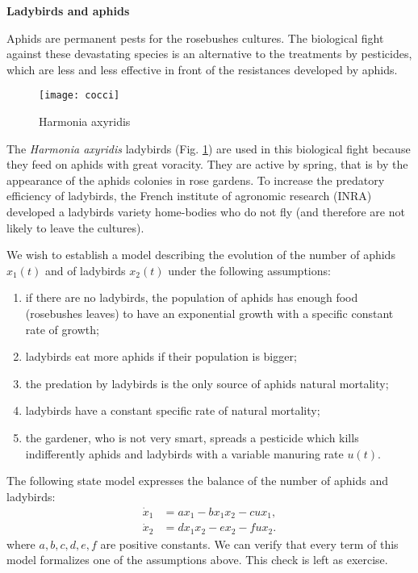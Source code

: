 \begin{exemple}{\bf Ladybirds and aphids}

Aphids are permanent pests for the rosebushes cultures. The biological fight against these devastating species is an alternative to the treatments by pesticides, which are less and less effective in front of the resistances developed by aphids.
\begin{figure}[ht]
\begin{center}
\texttt{[image: cocci]}
\caption{Harmonia axyridis}
\label{fig:cocci}
\end{center}
\end{figure}
The {\em Harmonia axyridis} ladybirds (Fig. \ref{fig:cocci}) are used in this biological fight because they feed on aphids with great voracity. They are active by spring, that is by the appearance of the aphids colonies in rose gardens. To increase the predatory efficiency of ladybirds, the French institute of agronomic research (INRA) developed a ladybirds variety \og home-bodies \gf who do not fly (and therefore are not likely to leave the cultures).

We wish to establish a model describing the evolution of the number of aphids $x_1(t)$ and of ladybirds $x_2(t)$ under the following assumptions:
\begin{enumerate}
\item if there are no ladybirds, the population of aphids has enough food (rosebushes leaves) to have an exponential growth with a specific constant rate of growth;
\item ladybirds eat more aphids if their population is bigger;
\item the predation by ladybirds is the only source of aphids natural mortality;
\item ladybirds have a constant specific rate of natural mortality;
\item the gardener, who is not very smart, spreads a pesticide which kills indifferently aphids and ladybirds with a variable manuring rate  $u(t)$.
\end{enumerate}
The following state model expresses the balance of the number of aphids and ladybirds:
\begin{equation} \begin{split}  \label{coc}
\dot x_1 &= ax_1 - bx_1x_2 - cux_1, \\
\dot x_2 &= dx_1x_2 - ex_2 - fux_2. 
\end{split} \end{equation} 
where $a,b,c,d,e,f$ are positive constants. We can verify that every term of this model formalizes one of the assumptions above. This check is left as exercise.\\


\end{exemple}
